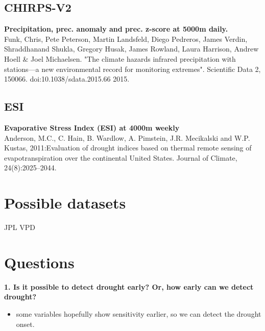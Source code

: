 \documentclass[a4paper,12pt,single,pdftex]{scrartcl}
\begin{document}
  \subsection{CHIRPS-V2}

    
      {\bf Precipitation, prec. anomaly and prec. z-score at 5000m daily.}
    \\

    
      Funk, Chris, Pete Peterson, Martin Landsfeld, Diego Pedreros, James Verdin, Shraddhanand Shukla, Gregory Husak, James Rowland, Laura Harrison, Andrew Hoell \& Joel Michaelsen. "The climate hazards infrared precipitation with stations—a new environmental record for monitoring extremes". Scientific Data 2, 150066. doi:10.1038/sdata.2015.66 2015.
    \\

  \subsection{ESI}

    
      
        
          {\bf Evaporative Stress Index (ESI) at 4000m weekly}
        \\

        
          Anderson, M.C., C. Hain, B. Wardlow, A. Pimstein, J.R. Mecikalski and W.P. Kustas, 2011:Evaluation of drought indices based on thermal remote sensing of evapotranspiration over the continental United States. Journal of Climate, 24(8):2025–2044.
        \\

      
    
  \section{Possible datasets}


JPL VPD\section{Questions}

    
      {\bf 1. Is it possible to detect drought early? Or, how early can we detect drought?}
    \\

    \begin{itemize}
  \item 
        some variables hopefully show sensitivity earlier, so we can detect the drought onset.
      
    \end{itemize}
  
\end{document}
